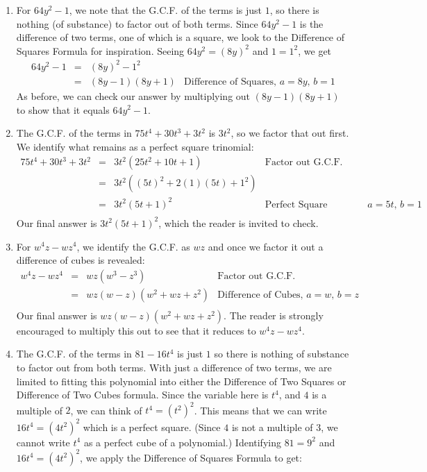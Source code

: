 \documentclass{ximera}
\begin{document}
\begin{example}
\begin{explanation}
\begin{enumerate}
\item  For $64y^2 - 1$, we note that the G.C.F. of the terms is just $1$, so there is nothing (of substance) to factor out of both terms. Since $64y^2 - 1$ is the difference of two terms, one of which is a square, we look to the Difference of Squares Formula for inspiration.   Seeing $64y^2 = (8y)^2$ and $1 = 1^2$, we get \[ \begin{array}{rclr} 

64y^2 - 1 & = & (8y)^2 - 1^2 & \\
          & = & (8y-1)(8y+1) & \text{Difference of Squares, $a = 8y$, $b = 1$} \end{array} \] As before, we can check our answer by multiplying out $(8y-1)(8y+1)$ to show that it equals $64y^2 - 1$.

\item  The G.C.F. of the terms in $75t^4 + 30t^3 + 3t^2$ is $3t^2$, so we factor that out first.  We identify what remains as a perfect square trinomial:\[ \begin{array}{rclr}
 
75t^4 + 30t^3 + 3t^2 & = & 3t^2 (25t^2+10t + 1) & \text{Factor out G.C.F.}\\
                     & = & 3t^2 ((5t)^2 + 2(1)(5t) + 1^2) & \\
                     & = & 3t^2 (5t+1)^2 & \text{Perfect Square Trinomial, $a = 5t$, $b = 1$} \\

\end{array}\] Our final answer is $3t^2 (5t+1)^2$, which the reader is invited to check.

\item  For $w^4 z - w z^4$, we identify the G.C.F. as $wz$ and once we factor it out a difference of cubes is revealed: \[ \begin{array}{rclr}

w^4 z - w z^4 & = & wz(w^3 - z^3) & \text{Factor out G.C.F.} \\
              & = & wz(w-z)(w^2+wz+z^2) & \text{Difference of Cubes, $a=w$, $b = z$} \\
							\end{array} \] Our final answer is $wz(w-z)(w^2+wz+z^2)$.  The reader is strongly encouraged to multiply this out to see that it reduces to $w^4 z - w z^4$.

\item  The G.C.F. of the terms in $81 - 16t^4$ is just $1$ so there is nothing of substance to factor out from both terms.  With just a difference of two terms, we are limited to fitting this polynomial into either the Difference of Two Squares or Difference of Two Cubes formula. Since the variable here is $t^4$, and $4$ is a multiple of $2$, we can think of $t^4 = (t^2)^2$.  This means that we can write $16t^4 = (4t^2)^2$ which is a perfect square.  (Since $4$ is not a multiple of $3$, we cannot write $t^4$ as a perfect cube of a polynomial.)  Identifying $81 = 9^2$ and $16t^4 = (4t^2)^2$, we apply the Difference of Squares Formula to get: \[ \begin{array}{rclr}


\end{array}\]
\end{enumerate}
\end{explanation}
\end{example}
\end{document}
